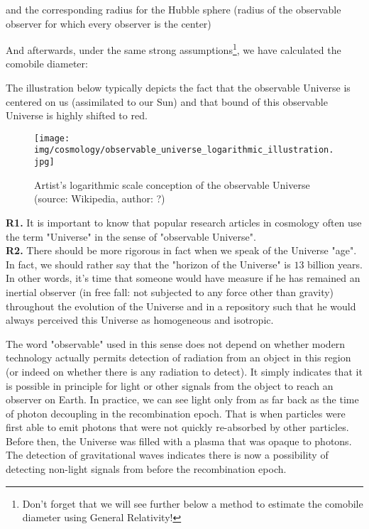 	and the corresponding radius for the Hubble sphere (radius of the observable observer for which every observer is the center)
	
	And afterwards, under the same strong assumptions\footnote{Don't forget that we will see further below a method to estimate the comobile diameter using General Relativity!}, we have calculated the comobile diameter:
	
	
	The illustration below typically depicts the fact that the observable Universe is centered on us (assimilated to our Sun) and that bound of this observable Universe is highly shifted to red.
	
	\begin{figure}[H]
		\centering
		\texttt{[image: img/cosmology/observable\_universe\_logarithmic\_illustration.jpg]}
		\caption[Artist's logarithmic scale conception of the observable Universe]{Artist's logarithmic scale conception of the observable Universe (source: Wikipedia, author: ?)}
	\end{figure}
	
	\begin{tcolorbox}[title=Remarks,colframe=black,arc=10pt]
	\textbf{R1.} It is important to know that popular research articles in cosmology  often use the term "Universe" in the sense of "observable Universe".\\
	
	\textbf{R2.} There should be more rigorous in fact when we speak of the Universe "age". In fact, we should rather say that the "horizon of the Universe" is $13$ billion years. In other words, it's time that someone would have measure if he has remained an inertial observer (in free fall: not subjected to any force other than gravity) throughout the evolution of the Universe and in a repository such that he would always perceived this Universe as homogeneous and isotropic.
	\end{tcolorbox}
	The word "observable" used in this sense does not depend on whether modern technology actually permits detection of radiation from an object in this region (or indeed on whether there is any radiation to detect). It simply indicates that it is possible in principle for light or other signals from the object to reach an observer on Earth. In practice, we can see light only from as far back as the time of photon decoupling in the recombination epoch. That is when particles were first able to emit photons that were not quickly re-absorbed by other particles. Before then, the Universe was filled with a plasma that was opaque to photons. The detection of gravitational waves indicates there is now a possibility of detecting non-light signals from before the recombination epoch.
	
